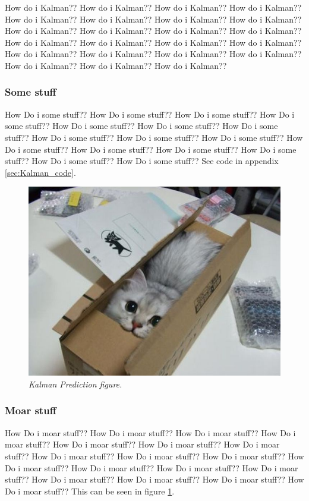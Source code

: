 How do i Kalman?? How do i Kalman?? How do i Kalman?? How do i Kalman?? How do i Kalman?? How do i Kalman?? How do i Kalman?? How do i Kalman?? How do i Kalman?? How do i Kalman?? How do i Kalman?? How do i Kalman?? How do i Kalman?? How do i Kalman?? How do i Kalman?? How do i Kalman?? How do i Kalman?? How do i Kalman?? How do i Kalman?? How do i Kalman?? How do i Kalman?? How do i Kalman?? How do i Kalman?? 

\subsubsection{Some stuff}
How Do i some stuff?? How Do i some stuff?? How Do i some stuff?? How Do i some stuff?? How Do i some stuff?? How Do i some stuff?? How Do i some stuff?? How Do i some stuff?? How Do i some stuff?? How Do i some stuff?? How Do i some stuff?? How Do i some stuff?? How Do i some stuff?? How Do i some stuff?? How Do i some stuff?? How Do i some stuff?? 
See code in appendix \ref{sec:Kalman_code}. %

\begin{figure}[htb]
	\centering
	\includegraphics[width=\linewidth]{images/acatisfinetoo}
	\caption{\textit{Kalman Prediction figure.}}
	\label{fig:kalman_fig} %
\end{figure}

\subsubsection{Moar stuff}
How Do i moar stuff?? How Do i moar stuff?? How Do i moar stuff?? How Do i moar stuff?? How Do i moar stuff?? How Do i moar stuff?? How Do i moar stuff?? How Do i moar stuff?? How Do i moar stuff?? How Do i moar stuff?? How Do i moar stuff?? How Do i moar stuff?? How Do i moar stuff?? How Do i moar stuff?? How Do i moar stuff?? How Do i moar stuff?? How Do i moar stuff?? How Do i moar stuff??  
This can be seen in figure \ref{fig:kalman_fig}. %